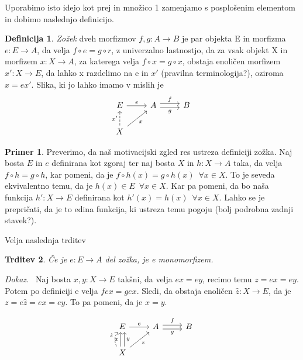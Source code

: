 \documentclass[12pt,a4paper]{book}
\theoremstyle{definition}
\newtheorem{definicija}{Definicija}[chapter]
\theoremstyle{plain}
\newtheorem{trditev}[definicija]{Trditev}
\newenvironment{dokaz}{\emph{Dokaz.}\ }{\hspace{\fill}{$\Box$}}
\theoremstyle{definition}
\newtheorem{primer}{Primer}[section]
\theoremstyle{remark}
\begin{document}
Uporabimo isto idejo kot prej in množico 1 zamenjamo s posplošenim elementom in dobimo naslednjo definicijo.

\begin{definicija}
\textit{Zožek} dveh morfizmov $f, g : A \to B$ je par objekta E in morfizma $e : E \to A$, da velja $f \circ e = g \circ r$, z univerzalno lastnostjo, da za vsak objekt X in morfizem $x : X \to A$, za katerega velja $f \circ x = g \circ x$, obstaja enoličen morfizem $x' : X \to E$, da lahko x razdelimo na e in $x'$ (pravilna terminologija?), oziroma $x = ex'$.
Slika, ki jo lahko imamo v mislih je
$$\begin{tikzcd}
E \ar[r, "e"] & A \ar[r, shift left, "f"] \ar[r, shift right, "g"'] & B \\
X \ar[u, dashed, "x'"] \ar[ur, "x"']
\end{tikzcd}$$

\end{definicija}

\begin{primer}
Preverimo, da naš motivacijski zgled res ustreza definiciji zožka. Naj bosta $E$ in $e$ definirana kot zgoraj ter naj bosta $X$ in $h:X \to A$ taka, da velja $f \circ h = g \circ h$, kar pomeni, da je $f \circ h(x) = g \circ  h(x) \enspace \forall x \in X$. To je seveda ekvivalentno temu, da je $h(x) \in E \enspace \forall x \in X$. Kar pa pomeni, da bo naša funkcija $h' : X \to E$ definirana kot $h'(x) = h(x) \enspace \forall x \in X$. Lahko se je prepričati, da je to edina funkcija, ki ustreza temu pogoju (bolj podrobna zadnji stavek?).
\end{primer}

Velja naslednja trditev

\begin{trditev}
Če je $e : E \to A$ del zožka, je e monomorfizem.
\end{trditev}
\begin{dokaz}
Naj bosta $x,y : X \to E$ takšni, da velja $ex = ey$, recimo temu $z = ex = ey$. Potem po definiciji e velja $fex = gex$. Sledi, da obstaja enoličen $\hat{z} : X \to E$, da je $z = e\hat{z} = ex = ey$. To pa pomeni, da je $x = y$.

$$\begin{tikzcd}
E \ar[r, "e"] & A \ar[r, shift left, "f"] \ar[r, shift right, "g"'] & B \\
X \ar[u, bend left, shift left, dashed, "\hat{z}"] \ar[u, shift left, "x"] \ar[u, shift right, "y"'] \ar[ur, "z"'] \\
\end{tikzcd}$$

\end{dokaz}
\end{document}
